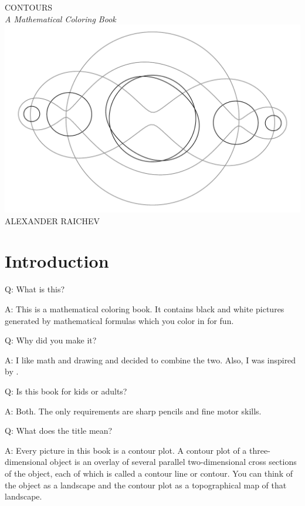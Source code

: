 \documentclass[12pt, a4paper]{amsart}
\begin{document}
\begin{titlepage}

\noindent
\begin{center}
{\fontsize{2cm}{1em}\selectfont CONTOURS}\\[1.5em]
{\fontsize{0.7cm}{1em}\selectfont\itshape A Mathematical Coloring Book}\\[4em]
\includegraphics[width=160mm, angle=90]{images/cover.pdf}\\
\vfill
{\fontsize{0.6cm}{1em}\selectfont ALEXANDER RAICHEV}
\end{center}
\end{titlepage}

\section*{Introduction}

Q: What is this?

A: This is a mathematical coloring book.
It contains black and white pictures generated by mathematical formulas which you color in for fun.

Q: Why did you make it? 

A: I like math and drawing and decided to combine the two.
Also, I was inspired by \cite{Hamp2009}.

Q: Is this book for kids or adults?

A: Both.
The only requirements are sharp pencils and fine motor skills.

Q: What does the title mean? 

A: Every picture in this book is a contour plot.
A contour plot of a three-dimensional object is an overlay of several parallel two-dimensional cross sections of the object, each of which is called a contour line or contour.
You can think of the object as a landscape and the contour plot as a topographical map of that landscape.
\end{document}
